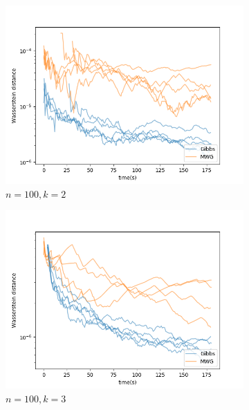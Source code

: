 \begin{figure}[H]
\begin{subfigure}{0.3\linewidth}
    	\includegraphics[width=\linewidth]{../../plots/KL_M3_N100_NMCMC3_seed0_diffind2.png}
    	\caption{$n=100, k=2$}
	\end{subfigure}
	\begin{subfigure}{0.3\linewidth}
	    \centering
    	\includegraphics[width=\linewidth]{../../plots/KL_M4_N100_NMCMC3_seed0_diffind2.png}
    	\caption{$n=100, k=3$}
	\end{subfigure}
	\begin{subfigure}{0.3\linewidth}
	    \centering

\end{subfigure}
\end{figure}
